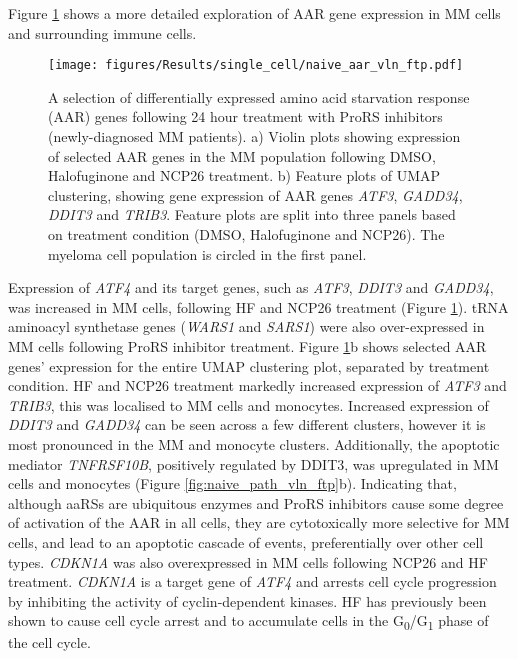 Figure \ref{fig:naive_aar_vln_ftp} shows a more detailed exploration of AAR gene expression in MM cells and surrounding immune cells.
%
\begin{figure}[htb]
\centering
\texttt{[image: figures/Results/single\_cell/naive\_aar\_vln\_ftp.pdf]}
\caption[scRNA-seq differentially expressed AAR genes- newly diagnosed patients]{A selection of differentially expressed amino acid starvation response (AAR) genes following 24 hour treatment with ProRS inhibitors (newly-diagnosed MM patients).
    a) Violin plots showing expression of selected AAR genes in the MM population following DMSO, Halofuginone and NCP26 treatment.
    b) Feature plots of UMAP clustering, showing gene expression of AAR genes \textit{ATF3}, \textit{GADD34}, \textit{DDIT3} and \textit{TRIB3}.
Feature plots are split into three panels based on treatment condition (DMSO, Halofuginone and NCP26).
The myeloma cell population is circled in the first panel.}
\label{fig:naive_aar_vln_ftp}
\end{figure}
Expression of \textit{ATF4} and its target genes, such as \textit{ATF3}, \textit{DDIT3} and  \textit{GADD34}, was increased in MM cells, following HF and NCP26 treatment (Figure \ref{fig:naive_aar_vln_ftp}).
tRNA aminoacyl synthetase genes (\textit{WARS1} and \textit{SARS1}) were also over-expressed in MM cells following ProRS inhibitor treatment.
Figure \ref{fig:naive_aar_vln_ftp}b shows selected AAR genes' expression for the entire UMAP clustering plot, separated by treatment condition.
HF and NCP26 treatment markedly increased expression of \textit{ATF3} and \textit{TRIB3}, this was localised to MM cells and monocytes.
Increased expression of \textit{DDIT3} and \textit{GADD34} can be seen across a few different clusters, however it is most pronounced in the MM and monocyte clusters.
Additionally, the apoptotic mediator \textit{TNFRSF10B}, positively regulated by DDIT3, was upregulated in MM cells and monocytes (Figure \ref{fig:naive_path_vln_ftp}b).
Indicating that, although aaRSs are ubiquitous enzymes and ProRS inhibitors cause some degree of activation of the AAR in all cells, they are cytotoxically more selective for MM cells, and lead to an apoptotic cascade of events, preferentially over other cell types.
\textit{CDKN1A} was also overexpressed in MM cells following NCP26 and HF treatment.
\textit{CDKN1A} is a target gene of \textit{ATF4} and arrests cell cycle progression by inhibiting the activity of cyclin-dependent kinases.
HF has previously been shown to cause cell cycle arrest and to accumulate cells in the G\textsubscript{0}/G\textsubscript{1} phase of the cell cycle.
